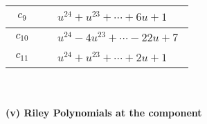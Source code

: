 \documentclass[1p]{elsarticle_modified}
\theoremstyle{definition}
\begin{document}
\begin{tabular}{m{50pt}|m{274pt}}
\hline $$\begin{aligned}c_{9}\end{aligned}$$&$\begin{aligned}
&u^{24}+u^{23}+\cdots+6 u+1
\end{aligned}$\\
\hline $$\begin{aligned}c_{10}\end{aligned}$$&$\begin{aligned}
&u^{24}-4 u^{23}+\cdots-22 u+7
\end{aligned}$\\
\hline $$\begin{aligned}c_{11}\end{aligned}$$&$\begin{aligned}
&u^{24}+u^{23}+\cdots+2 u+1
\end{aligned}$\\
\hline
\end{tabular}\\~\\
\newpage\renewcommand{\arraystretch}{1}
\flushleft \textbf{(v) Riley Polynomials at the component}\newline \\
\end{document}
